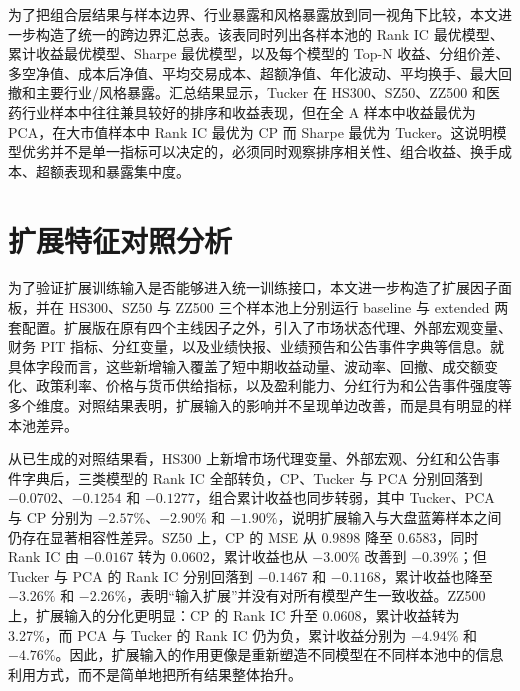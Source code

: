 为了把组合层结果与样本边界、行业暴露和风格暴露放到同一视角下比较，本文进一步构造了统一的跨边界汇总表。该表同时列出各样本池的 Rank IC 最优模型、累计收益最优模型、Sharpe 最优模型，以及每个模型的 Top-N 收益、分组价差、多空净值、成本后净值、平均交易成本、超额净值、年化波动、平均换手、最大回撤和主要行业/风格暴露。汇总结果显示，Tucker 在 HS300、SZ50、ZZ500 和医药行业样本中往往兼具较好的排序和收益表现，但在全 A 样本中收益最优为 PCA，在大市值样本中 Rank IC 最优为 CP 而 Sharpe 最优为 Tucker。这说明模型优劣并不是单一指标可以决定的，必须同时观察排序相关性、组合收益、换手成本、超额表现和暴露集中度。

\section{扩展特征对照分析}

为了验证扩展训练输入是否能够进入统一训练接口，本文进一步构造了扩展因子面板，并在 HS300、SZ50 与 ZZ500 三个样本池上分别运行 baseline 与 extended 两套配置。扩展版在原有四个主线因子之外，引入了市场状态代理、外部宏观变量、财务 PIT 指标、分红变量，以及业绩快报、业绩预告和公告事件字典等信息。就具体字段而言，这些新增输入覆盖了短中期收益动量、波动率、回撤、成交额变化、政策利率、价格与货币供给指标，以及盈利能力、分红行为和公告事件强度等多个维度。对照结果表明，扩展输入的影响并不呈现单边改善，而是具有明显的样本池差异。

从已生成的对照结果看，HS300 上新增市场代理变量、外部宏观、分红和公告事件字典后，三类模型的 Rank IC 全部转负，CP、Tucker 与 PCA 分别回落到 $-0.0702$、$-0.1254$ 和 $-0.1277$，组合累计收益也同步转弱，其中 Tucker、PCA 与 CP 分别为 $-2.57\%$、$-2.90\%$ 和 $-1.90\%$，说明扩展输入与大盘蓝筹样本之间仍存在显著相容性差异。SZ50 上，CP 的 MSE 从 0.9898 降至 0.6583，同时 Rank IC 由 $-0.0167$ 转为 0.0602，累计收益也从 $-3.00\%$ 改善到 $-0.39\%$；但 Tucker 与 PCA 的 Rank IC 分别回落到 $-0.1467$ 和 $-0.1168$，累计收益也降至 $-3.26\%$ 和 $-2.26\%$，表明“输入扩展”并没有对所有模型产生一致收益。ZZ500 上，扩展输入的分化更明显：CP 的 Rank IC 升至 0.0608，累计收益转为 3.27\%，而 PCA 与 Tucker 的 Rank IC 仍为负，累计收益分别为 $-4.94\%$ 和 $-4.76\%$。因此，扩展输入的作用更像是重新塑造不同模型在不同样本池中的信息利用方式，而不是简单地把所有结果整体抬升。

